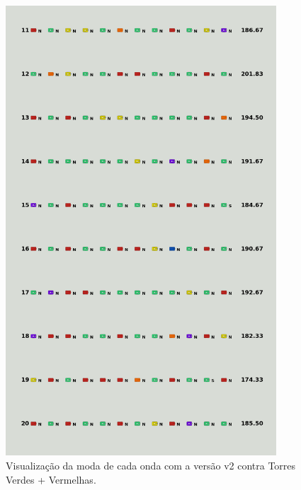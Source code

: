 \begin{figure}[H]
  \centering
  \includegraphics[width=0.9\textwidth]{figuras/td/td_greenred_ai_mode_2_2.png}
  \caption{Visualização da moda de cada onda com a versão v2 contra Torres Verdes + Vermelhas.}
  \label{fig:td-moda-greenred-2-2}
\end{figure}

